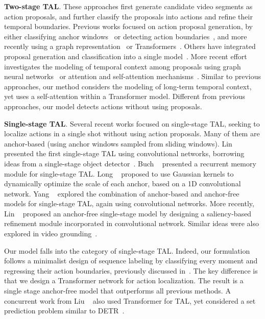 \noindent \textbf{Two-stage TAL}. These approaches first generate candidate video segments as action proposals, and further classify the proposals into actions and refine their temporal boundaries. Previous works focused on action proposal generation, by either classifying anchor windows~\cite{caba2016fast,escorcia2016daps,sstcvpr2017} or detecting action boundaries~\cite{bsneccv2018,bmniccv2019,mggcvpr2019,gong2020scale,bottumuptaleccv2020}, and more recently using a graph representation~\cite{bcgnneccv2020,gtadcvpr2020} or Transformers~\cite{tan2021relaxed,chang2021augmented,wang2021temporal}. Others have integrated proposal generation and classification into a single model~\cite{shou2016temporal,ssniccv2017,cdc2017cvpr,fasterrcnncvpr2018}. More recent effort investigates the modeling of temporal context among proposals using graph neural networks~\cite{pgcniccv2019,gtadcvpr2020,vsgniccv2021} or attention and self-attention mechanisms~\cite{contextlociccv2021,tcanetcvpr2021,csaiccv2021}. Similar to previous approaches, our method considers the modeling of long-term temporal context, yet uses a self-attention within a Transformer model. Different from previous approaches, our model detects actions without using proposals.\smallskip

\noindent \textbf{Single-stage TAL}. Several recent works focused on single-stage TAL, seeking to localize actions in a single shot without using action proposals. Many of them are anchor-based (\eg using anchor windows sampled from sliding windows). Lin \et\ \cite{sstadmm2017} presented the first single-stage TAL using convolutional networks, borrowing ideas from a single-stage object detector~\cite{liu2016ssd}. Buch \et\ \cite{sstadbmvc2017} presented a recurrent memory module for single-stage TAL. Long \et\  \cite{gaussiancvpr2019} proposed to use Gaussian kernels to dynamically optimize the scale of each anchor, based on a 1D convolutional network. Yang \et\ \cite{a2nettip2020} explored the combination of anchor-based and anchor-free models for single-stage TAL, again using convolutional networks. More recently, Lin \et\ \cite{afsdcvpr2021} proposed an anchor-free single-stage model by designing a saliency-based refinement module incorporated in convolutional network. Similar ideas were also explored in video grounding~\cite{zeng2020dense}. 

Our model falls into the category of single-stage TAL. Indeed, our formulation follows a minimalist design of sequence labeling by classifying every moment and regressing their action boundaries, previously discussed in~\cite{a2nettip2020,afsdcvpr2021}. The key difference is that we design a Transformer network for action localization. The result is a single stage anchor-free model that outperforms all previous methods. A concurrent work from Liu \et\ \cite{tadtrarxiv2021} also used Transformer for TAL, yet considered a set prediction problem similar to DETR~\cite{detreccv2020}. %
\smallskip 


